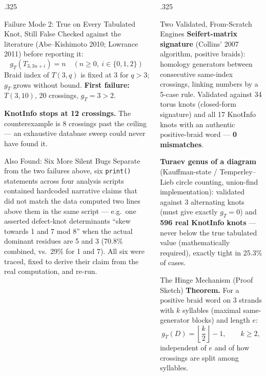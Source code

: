 \documentclass[final]{beamer}
\begin{document}
\begin{frame}[t]
\begin{columns}[t, totalwidth=\textwidth]
\begin{column}{.325\linewidth}
\begin{block}{Failure Mode 2: True on Every Tabulated Knot, Still False}
\vspace{8pt}
Checked against the literature (Abe--Kishimoto 2010; Lowrance 2011)
before reporting it:
\[ g_T(T_{3,3n+i}) = n \quad (n\ge0,\ i\in\{0,1,2\}) \]
Braid index of $T(3,q)$ is fixed at 3 for $q>3$; $g_T$ grows without
bound. \textbf{First failure: $T(3,10)$}, 20 crossings, $g_T=3>2$.

\vspace{8pt}
\textbf{KnotInfo stops at 12 crossings.} The counterexample is 8
crossings past the ceiling --- an exhaustive database sweep could never
have found it.
\end{block}

\begin{block}{Also Found: Six More Silent Bugs}
Separate from the two failures above, six \texttt{print()} statements
across four analysis scripts contained hardcoded narrative claims that
did not match the data computed two lines above them in the same script
--- e.g.\ one asserted defect-knot determinants ``skew towards 1 and 7
mod 8'' when the actual dominant residues are 5 and 3 (70.8\% combined,
vs.\ 29\% for 1 and 7). All six were traced, fixed to derive their claim
from the real computation, and re-run.
\end{block}

\end{column}

\begin{column}{.325\linewidth}

\begin{block}{Two Validated, From-Scratch Engines}
\textbf{Seifert-matrix signature} (Collins' 2007 algorithm, positive
braids): homology generators between consecutive same-index crossings,
linking numbers by a 5-case rule. Validated against 34 torus knots
(closed-form signature) and all 17 KnotInfo knots with an authentic
positive-braid word --- \textbf{0 mismatches}.

\vspace{8pt}
\textbf{Turaev genus of a diagram} (Kauffman-state / Temperley--Lieb
circle counting, union-find implementation): validated against 3
alternating knots (must give exactly $g_T{=}0$) and \textbf{596 real
KnotInfo knots} --- never below the true tabulated value (mathematically
required), exactly tight in 25.3\% of cases.
\end{block}

\begin{block}{The Hinge Mechanism (Proof Sketch)}
\textbf{Theorem.} For a positive braid word on 3 strands with $k$
syllables (maximal same-generator blocks) and length $e$:
\[
g_T(D) = \left\lfloor \frac{k}{2} \right\rfloor - 1, \qquad k\ge2,
\]
independent of $e$ and of how crossings are split among syllables.


\end{block}
\end{column}
\end{columns}
\end{frame}
\end{document}
